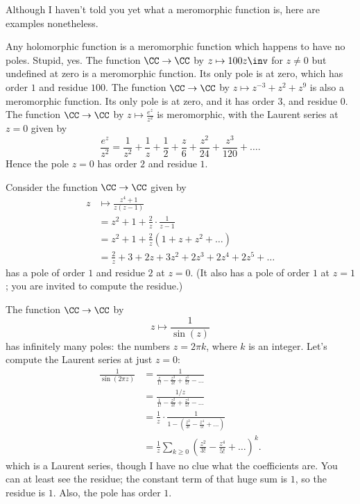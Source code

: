 \begin{definition}
Although I haven't told you yet what a meromorphic function is,
here are examples nonetheless.
\begin{example}
	\listhack
	\begin{enumerate}[(a)]
		\ii Any holomorphic function is a meromorphic function which happens to have no poles.
		Stupid, yes.
		\ii The function $\CC \to \CC$ by $z \mapsto 100z\inv$ for $z \neq 0$
		but undefined at zero is a meromorphic function.
		Its only pole is at zero, which has order $1$ and residue $100$.
		\ii The function $\CC \to \CC$ by $z \mapsto z^{-3} + z^2 + z^9$ is also a meromorphic function.
		Its only pole is at zero, and it has order $3$, and residue $0$.
		\ii The function $\CC \to \CC$ by $z \mapsto \frac{e^z}{z^2}$ is meromorphic,
		with the Laurent series at $z=0$ given by
		\[
			\frac{e^z}{z^2}
			= \frac{1}{z^2} + \frac{1}{z} + \frac{1}{2} + \frac{z}{6} + \frac{z^2}{24} + \frac{z^3}{120}
			+ \dots.
		\]
		Hence the pole $z=0$ has order $2$ and residue $1$.
	\end{enumerate}
\end{example}
\begin{example}
	Consider the function $\CC \to \CC$ given  by
	\begin{align*}
		z &\mapsto \frac{z^4+1}{z(z-1)} \\
		&= z^2 + 1 + \frac 2z \cdot \frac{1}{z-1} \\
		&= z^2 + 1 + \frac 2z \left( 1 + z + z^2 + \dots  \right) \\
		&= \frac 2z + 3 + 2z + 3z^2 + 2z^3 + 2z^4 + 2z^5 + \dots 
	\end{align*}
	has a pole of order $1$ and residue $2$ at $z=0$.
	(It also has a pole of order $1$ at $z=1$; you are invited to compute the residue.)
\end{example}
\begin{example}
	The function $\CC \to \CC$ by \[ z \mapsto \frac{1}{\sin(z)} \]
	has infinitely many poles: the numbers $z = 2\pi k$, where $k$ is an integer.
	Let's compute the Laurent series at just $z=0$:
	\begin{align*}
		\frac{1}{\sin(2\pi z)}
		&= \frac{1}{\frac{z}{1!} - \frac{z^3}{3!} + \frac{z^5}{5!} - \dots} \\
		&= \frac{1/z}{\frac{1}{1!} - \frac{z^2}{3!} + \frac{z^4}{5!} - \dots} \\
		&= \frac 1z \cdot \frac{1}{1 - \left( \frac{z^2}{3!} - \frac{z^4}{5!} + \dots \right)} \\
		&= \frac 1z \sum_{k \ge 0} \left( \frac{z^2}{3!} - \frac{z^4}{5!} + \dots \right)^k.
	\end{align*}
	which is a Laurent series, though I have no clue what the coefficients are.
	You can at least see the residue; the constant term of that huge sum is $1$,
	so the residue is $1$.
	Also, the pole has order $1$.
\end{example}


\end{definition}

